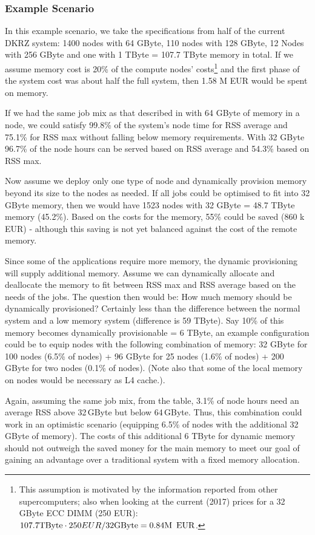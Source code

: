 \documentclass{../../template/esiwace-report}
\begin{document}
\subsubsection{Example Scenario}

In this example scenario, we take the specifications from half of the current DKRZ system: 1400 nodes with 64 GByte, 110 nodes with 128 GByte, 12 Nodes with 256 GByte and one with 1 TByte = 107.7 TByte memory in total.
If we assume memory cost is 20\% of the compute nodes' costs\footnote{This assumption is motivated by the information reported from other supercomputers; also when looking at the current (2017) prices for a 32 GByte ECC DIMM (250 EUR): $107.7 \mbox{TByte} \cdot 250  EUR / 32 \mbox{GByte}  = 0.84 \mbox{M\, EUR}$.} and the first phase of the system cost was about half the full system, then 1.58 M EUR would be spent on memory.


If we had the same job mix as that described in  with 64 GByte of memory in a node, we could satisfy 99.8\% of the system's node time for RSS average and 75.1\% for RSS max without falling below memory requirements.  With 32 GByte 96.7\% of the node hours can be served based on RSS average and 54.3\% based on RSS max.

Now assume we deploy only one type of node and dynamically provision memory beyond its size to the nodes as needed. If all jobs could be optimised to fit into 32 GByte memory, then we would have 1523 nodes with 32 GByte = 48.7 TByte memory (45.2\%). Based on the costs for the memory, 55\% could be saved (860 k EUR) - although this saving is not yet  balanced against the cost of the remote memory.

Since some of the applications require more memory, the dynamic provisioning will supply additional memory.
Assume we can dynamically allocate and deallocate the memory to fit between RSS max and RSS average based on the needs of the jobs. The question then would be: How much memory should be dynamically provisioned?
Certainly less than the difference between the normal system and a low memory system (difference is 59 TByte).
Say 10\% of this memory becomes dynamically provisionable = 6 TByte, an example configuration could be 
to equip nodes with the following combination of memory: 32 GByte for 100 nodes (6.5\% of nodes) + 96 GByte for 25 nodes (1.6\% of nodes) + 200 GByte for two nodes (0.1\% of nodes). (Note also that some of the local memory on nodes would be necessary as L4 cache.).

Again, assuming the same job mix, from the table, 3.1\% of node hours need an average RSS above 32\,GByte but below 64\,GByte. Thus, this combination could work in an optimistic scenario (equipping 6.5\% of nodes with the additional 32 GByte of memory). The costs of this additional 6 TByte for dynamic memory should not outweigh the saved money for the main memory to meet our goal of gaining an advantage over a traditional system with a fixed memory allocation.
\end{document}
